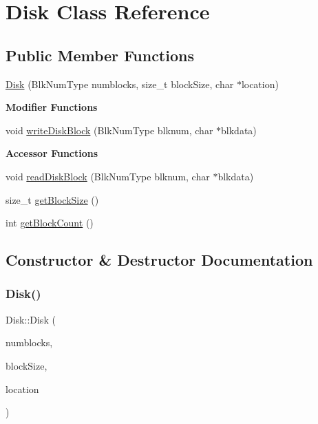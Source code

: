 \hypertarget{classDisk}{}\section{Disk Class Reference}
\label{classDisk}
\subsection*{Public Member Functions}
\begin{DoxyCompactItemize}
\item 
\mbox{\hyperlink{classDisk_a5be49d1002da046d1890df1b088900e4}{Disk}} (Blk\+Num\+Type numblocks, size\+\_\+t block\+Size, char $\ast$location)
\end{DoxyCompactItemize}
\begin{Indent}\textbf{ Modifier Functions}\par
\begin{DoxyCompactItemize}
\item 
void \mbox{\hyperlink{classDisk_a5d335138f56e6b87c8ebc4b6473183e7}{write\+Disk\+Block}} (Blk\+Num\+Type blknum, char $\ast$blkdata)
\end{DoxyCompactItemize}
\end{Indent}
\begin{Indent}\textbf{ Accessor Functions}\par
\begin{DoxyCompactItemize}
\item 
void \mbox{\hyperlink{classDisk_a2598cdd9013bdbb1213afa878c567daa}{read\+Disk\+Block}} (Blk\+Num\+Type blknum, char $\ast$blkdata)
\item 
size\+\_\+t \mbox{\hyperlink{classDisk_a1c149b57524fe4e7ae7c8643309e0501}{get\+Block\+Size}} ()
\item 
int \mbox{\hyperlink{classDisk_a3c61119ce5707dd4ab039201590a7c22}{get\+Block\+Count}} ()
\end{DoxyCompactItemize}
\end{Indent}


\subsection{Constructor \& Destructor Documentation}
\mbox{\label{classDisk_a5be49d1002da046d1890df1b088900e4}} 
\subsubsection{\texorpdfstring{Disk()}{Disk()}}
{\footnotesize\ttfamily Disk\+::\+Disk (\begin{DoxyParamCaption}\item[{Blk\+Num\+Type}]{numblocks,  }\item[{size\+\_\+t}]{block\+Size,  }\item[{char $\ast$}]{location }\end{DoxyParamCaption})}


